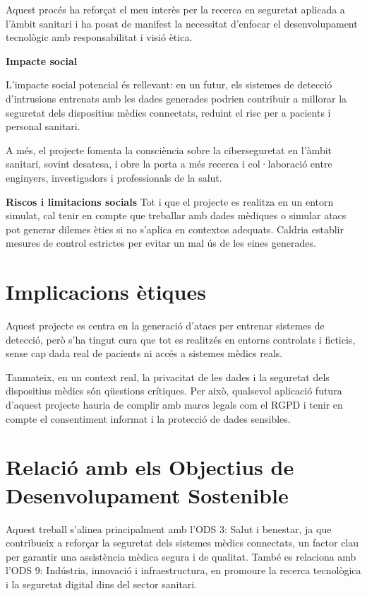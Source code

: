 Aquest procés ha reforçat el meu interès per la recerca en seguretat aplicada a l’àmbit sanitari i ha posat de manifest la necessitat d’enfocar el desenvolupament tecnològic amb responsabilitat i visió ètica.

\textbf{Impacte social}

L’impacte social potencial és rellevant: en un futur, els sistemes de detecció d’intrusions entrenats amb les dades generades podrien contribuir a millorar la seguretat dels dispositius mèdics connectats, reduint el risc per a pacients i personal sanitari.

A més, el projecte fomenta la consciència sobre la ciberseguretat en l’àmbit sanitari, sovint desatesa, i obre la porta a més recerca i col·laboració entre enginyers, investigadors i professionals de la salut.

\textbf{Riscos i limitacions socials}
Tot i que el projecte es realitza en un entorn simulat, cal tenir en compte que treballar amb dades mèdiques o simular atacs pot generar dilemes ètics si no s’aplica en contextos adequats. Caldria establir mesures de control estrictes per evitar un mal ús de les eines generades.

\section{Implicacions ètiques}
Aquest projecte es centra en la generació d’atacs per entrenar sistemes de detecció, però s’ha tingut cura que tot es realitzés en entorns controlats i ficticis, sense cap dada real de pacients ni accés a sistemes mèdics reals.

Tanmateix, en un context real, la privacitat de les dades i la seguretat dels dispositius mèdics són qüestions crítiques. Per això, qualsevol aplicació futura d’aquest projecte hauria de complir amb marcs legals com el RGPD i tenir en compte el consentiment informat i la protecció de dades sensibles.

\section{Relació amb els Objectius de Desenvolupament Sostenible}
Aquest treball s’alinea principalment amb l’ODS 3: Salut i benestar, ja que contribueix a reforçar la seguretat dels sistemes mèdics connectats, un factor clau per garantir una assistència mèdica segura i de qualitat. També es relaciona amb l’ODS 9: Indústria, innovació i infraestructura, en promoure la recerca tecnològica i la seguretat digital dins del sector sanitari.
